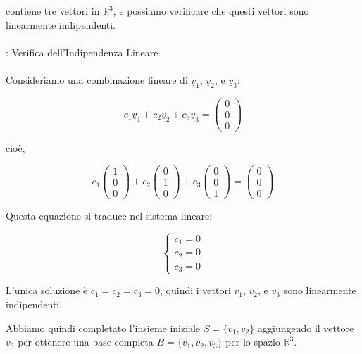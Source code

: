 \begin{es}
	contiene tre vettori in \( \mathbb{R}^3 \), e possiamo verificare che questi vettori sono linearmente indipendenti.
	\leavevmode\\\\
	: Verifica dell'Indipendenza Lineare
	\leavevmode\\\\
	Consideriamo una combinazione lineare di \( \underline{v}_1 \), \( \underline{v}_2 \), e \( \underline{v}_3 \):
	
	\[
	c_1 \underline{v}_1 + c_2 \underline{v}_2 + c_3 \underline{v}_3 = \begin{pmatrix} 0 \\ 0 \\ 0 \end{pmatrix}
	\]
	
	cioè,
	
	\[
	c_1 \begin{pmatrix} 1 \\ 0 \\ 0 \end{pmatrix} + c_2 \begin{pmatrix} 0 \\ 1 \\ 0 \end{pmatrix} + c_3 \begin{pmatrix} 0 \\ 0 \\ 1 \end{pmatrix} = \begin{pmatrix} 0 \\ 0 \\ 0 \end{pmatrix}
	\]
	
	Questa equazione si traduce nel sistema lineare:
	
	\[
	\begin{cases}
		c_1 = 0 \\
		c_2 = 0 \\
		c_3 = 0
	\end{cases}
	\]
	
	L'unica soluzione è \( c_1 = c_2 = c_3 = 0 \), quindi i vettori \( v_1 \), \( v_2 \), e \( v_3 \) sono linearmente indipendenti.

	Abbiamo quindi completato l'insieme iniziale \( S = \{v_1, v_2\} \) aggiungendo il vettore \( v_3 \) per ottenere una base completa \( B = \{v_1, v_2, v_3\} \) per lo spazio \( \mathbb{R}^3 \).
\end{es}

